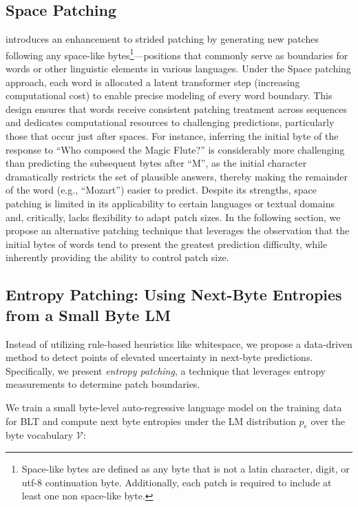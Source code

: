 \subsection{Space Patching}
\label{section:white-patch}

\citet{slagle2024spacebyte} introduces an enhancement to strided patching by generating new patches following any space-like bytes\footnote{
    Space-like bytes are defined as any byte that is not a latin character, digit, or utf-8 continuation byte. Additionally, each patch is required to include at least one non space-like byte. }—positions that commonly serve as boundaries for words or other linguistic elements in various languages. Under the Space patching approach, each word is allocated a latent transformer step (increasing computational cost) to enable precise modeling of every word boundary. This design ensures that words receive consistent patching treatment across sequences and dedicates computational resources to challenging predictions, particularly those that occur just after spaces. For instance, inferring the initial byte of the response to ``Who composed the Magic Flute?\uline{\hspace{.6em}}'' is considerably more challenging than predicting the subsequent bytes after “M”, as the initial character dramatically restricts the set of plausible answers, thereby making the remainder of the word (e.g., “Mozart”) easier to predict. Despite its strengths, space patching is limited in its applicability to certain languages or textual domains and, critically, lacks flexibility to adapt patch sizes. In the following section, we propose an alternative patching technique that leverages the observation that the initial bytes of words tend to present the greatest prediction difficulty, while inherently providing the ability to control patch size.

\subsection{Entropy Patching: Using Next-Byte Entropies from a Small Byte LM}
\label{section:dyn-patch}

Instead of utilizing rule-based heuristics like whitespace, we propose a data-driven method to detect points of elevated uncertainty in next-byte predictions. Specifically, we present \textit{entropy patching}, a technique that leverages entropy measurements to determine patch boundaries.

We train a small byte-level auto-regressive language model on the training data for {\textsc BLT} and compute next byte entropies under the LM distribution $p_{e}$ over the byte vocabulary $\mathcal{V}$:

